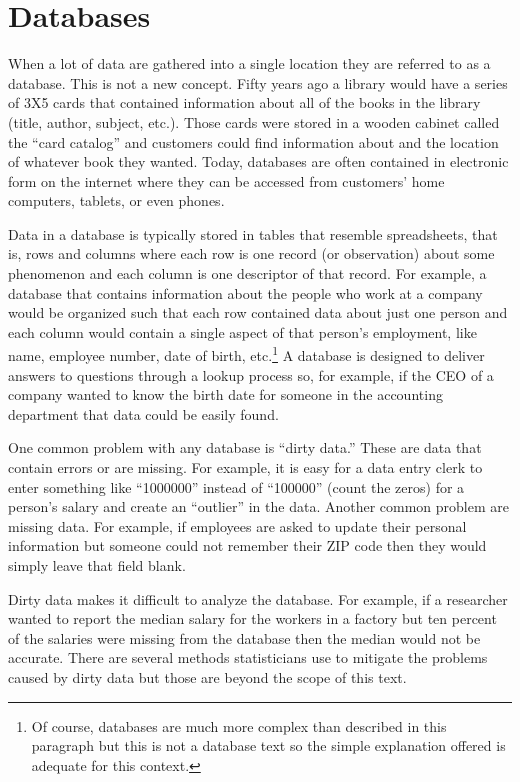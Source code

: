 \section{Databases}

When a lot of data are gathered into a single location they are referred to as a \gls{database}. This is not a new concept. Fifty years ago a library would have a series of 3X5 cards that contained information about all of the books in the library (title, author, subject, etc.). Those cards were stored in a wooden cabinet called the ``card catalog'' and customers could find information about and the location of whatever book they wanted. Today, databases are often contained in electronic form on the internet where they can be accessed from customers' home computers, tablets, or even phones.

Data in a database is typically stored in tables that resemble spreadsheets, that is, rows and columns where each row is one record (or observation) about some phenomenon and each column is one descriptor of that record. For example, a database that contains information about the people who work at a company would be organized such that each row contained data about just one person and each column would contain a single aspect of that person's employment, like name, employee number, date of birth, etc.\footnote{Of course, databases are much more complex than described in this paragraph but this is not a database text so the simple explanation offered is adequate for this context.} A database is designed to deliver answers to questions through a lookup process so, for example, if the CEO of a company wanted to know the birth date for someone in the accounting department that data could be easily found. 

One common problem with any database is ``dirty data.'' These are data that contain errors or are missing. For example, it is easy for a data entry clerk to enter something like ``1000000'' instead of ``100000'' (count the zeros) for a person's salary and create an ``outlier'' in the data. Another common problem are missing data. For example, if employees are asked to update their personal information but someone could not remember their ZIP code then they would simply leave that field blank.

Dirty data makes it difficult to analyze the database. For example, if a researcher wanted to report the median salary for the workers in a factory but ten percent of the salaries were missing from the database then the median would not be accurate. There are several methods statisticians use to mitigate the problems caused by dirty data but those are beyond the scope of this text. 

